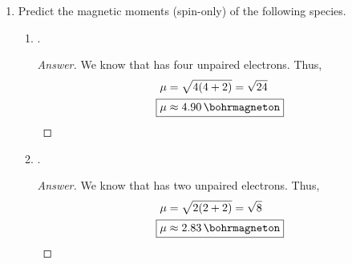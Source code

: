 \documentclass[../psets.tex]{subfiles}
\begin{document}
\begin{enumerate}[label={\Roman*)}]
\begin{enumerate}[label={\textbf{10.\arabic*}}]
\begin{enumerate}[label={\textbf{\alph*.}}]
\begin{proof}[Answer]
\begin{center}
                \end{center}
            \end{proof}
            \item A coordination compound with a magnetic moment of $5.1$ Bohr magnetons.
            \begin{proof}[Answer]
                Using the spin-only magnetic moment formula $\mu_S=\sqrt{n(n+2)}$, we can solve for $n$ with the quadratic formula, take the positive answer, and round.
                \begin{align*}
                    5.1 &= \sqrt{n(n+2)}\\
                    0 &= n^2+2n-5.1^2\\
                    \Aboxed{n &\approx 4}
                \end{align*}
            \end{proof}
        \end{enumerate}
        \newpage
        \setcounter{enumii}{5}
        \item Predict the magnetic moments (spin-only) of the following species.
        \begin{enumerate}[label={\textbf{\alph*.}}]
            \item {}.
            \begin{proof}[Answer]
                We know that  has four unpaired electrons. Thus,
                \begin{align*}
                    \mu &= \sqrt{4(4+2)} = \sqrt{24}\\
                    \Aboxed{\mu &\approx \SI{4.90}{\bohrmagneton}}
                \end{align*}
            \end{proof}
            \item {}.
            \begin{proof}[Answer]
                We know that  has two unpaired electrons. Thus,
                \begin{align*}
                    \mu &= \sqrt{2(2+2)} = \sqrt{8}\\
                    \Aboxed{\mu &\approx \SI{2.83}{\bohrmagneton}}
                \end{align*}

\end{proof}
\end{enumerate}
\end{enumerate}
\end{enumerate}
\end{document}
